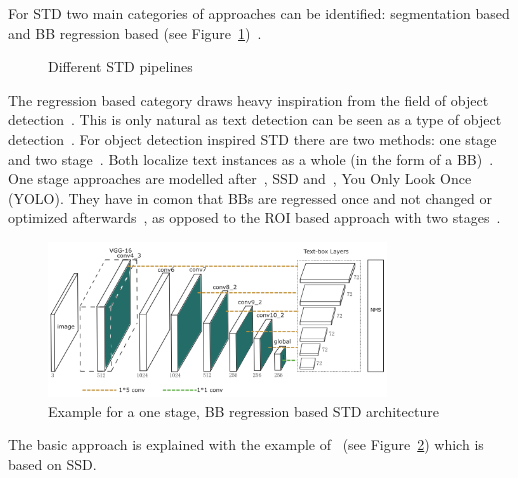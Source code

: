 For \ac{STD} two main categories of approaches can be identified: segmentation based and \ac{BB}
regression based (see
Figure~\ref{fig:STD-pipelines})~\citep{long_scene_2021,sheng_centripetaltext_2021,liu_accurate_2020}.
\begin{figure}[ht]
    \centering
    
    \caption{Different STD pipelines\label{fig:STD-pipelines}}
\end{figure}
The regression based category draws heavy inspiration from the field of object
detection~\citep{long_scene_2021,liu_accurate_2020}.
This is only natural as text detection can be seen as a type of object
detection~\citep{liu_accurate_2020,long_scene_2021}.
For object detection inspired \ac{STD} there are two methods: one stage and two
stage~\citep{long_scene_2021}.
Both localize text instances as a whole (in the form of a
\ac{BB})~\citep{long_scene_2021,sheng_centripetaltext_2021}.
One stage approaches are modelled after~\cite{liu_ssd_2016}, \ac{SSD} and~\cite{redmon_you_2016},
You Only Look Once (YOLO).
They have in comon that \acp{BB} are regressed once and not changed or optimized
afterwards~\citep{redmon_you_2016,liu_ssd_2016}, as opposed to the \ac{ROI} based approach with two
stages~\citep{girshick_rich_2014}.
\begin{figure}[ht]
    \centering
    \includegraphics[width=0.8\textwidth]{img/STD-seg-free-Liao-TextBoxes-2017.png}
    \caption[One stage, BB regression based STD architecture]{%
        Example for a one stage, BB regression based STD
        architecture~\citep{liao_textboxes_2017}\label{fig:STD-segfree-ssd}
    }
\end{figure}
The basic approach is explained with the example of~\cite{liao_textboxes_2017} (see
Figure~\ref{fig:STD-segfree-ssd}) which is based on \ac{SSD}.
